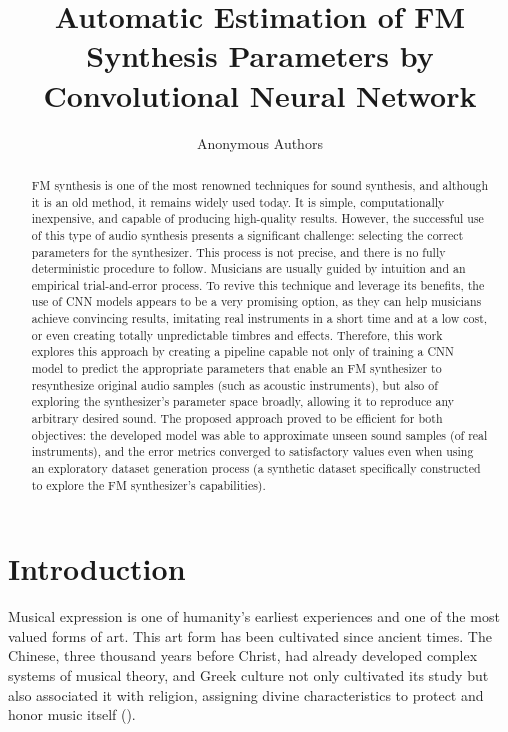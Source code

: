 \documentclass[10pt,conference]{IEEEtran}
\title{\LARGE \bf
Automatic Estimation of FM Synthesis Parameters by Convolutional Neural Network
}
\begin{document}
\author{Anonymous Authors}

\maketitle
\thispagestyle{empty}
\pagestyle{empty}

\begin{abstract}
FM synthesis is one of the most renowned techniques for sound synthesis, and although it is an old method, it remains widely used today. It is simple, computationally inexpensive, and capable of producing high-quality results. However, the successful use of this type of audio synthesis presents a significant challenge: selecting the correct parameters for the synthesizer. This process is not precise, and there is no fully deterministic procedure to follow. Musicians are usually guided by intuition and an empirical trial-and-error process. To revive this technique and leverage its benefits, the use of CNN models appears to be a very promising option, as they can help musicians achieve convincing results, imitating real instruments in a short time and at a low cost, or even creating totally unpredictable timbres and effects. Therefore, this work explores this approach by creating a pipeline capable not only of training a CNN model to predict the appropriate parameters that enable an FM synthesizer to resynthesize original audio samples (such as acoustic instruments), but also of exploring the synthesizer’s parameter space broadly, allowing it to reproduce any arbitrary desired sound. The proposed approach proved to be efficient for both objectives: the developed model was able to approximate unseen sound samples (of real instruments), and the error metrics converged to satisfactory values even when using an exploratory dataset generation process (a synthetic dataset specifically constructed to explore the FM synthesizer’s capabilities).
\end{abstract}



\section{Introduction}

Musical expression is one of humanity’s earliest experiences and one of the most valued forms of art. This art form has been cultivated since ancient times. The Chinese, three thousand years before Christ, had already developed complex systems of musical theory, and Greek culture not only cultivated its study but also associated it with religion, assigning divine characteristics to protect and honor music itself (\cite{med1996teoria}).
\end{document}
